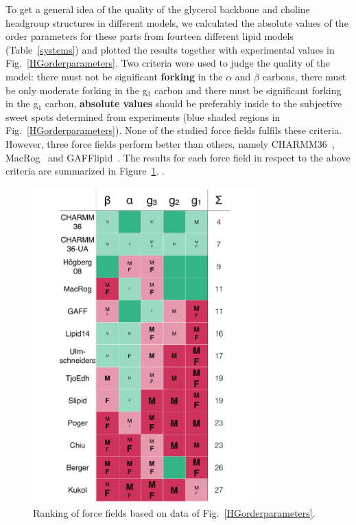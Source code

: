 \documentclass[pre,aps,floatfix,authordate1-4,twocolumn]{revtex4-1}
\begin{document}
To get a general idea of the quality of the glycerol backbone and choline headgroup structures in different models, we calculated the absolute
values of the order parameters for these parts from fourteen different lipid models (Table~\ref{systems}) and 
plotted the results together with experimental values in Fig.~\ref{HGorderparameters}.
Two criteria were used to judge the quality of the model: there must not be significant  {\bf forking} in the $\alpha$ and $\beta$ carbons,
there must be only moderate forking in the g$_3$ carbon and there must be significant forking in the g$_1$ carbon, {\bf absolute values}
should be preferably inside to the subjective sweet spots determined from experiments (blue shaded regions in Fig.~\ref{HGorderparameters}).
None of the studied force fields fulfils these criteria. However, three force fields perform better than others, namely CHARMM36~\cite{klauda10}, MacRog~\cite{maciejewski14} and GAFFlipid~\cite{dickson12}.
The results for each force field in respect to the above criteria are summarized in Figure~\ref{FullHydrationComparisonTable}.
.
\begin{figure}[]
  \centering
  \includegraphics[width=8.6cm]{../DATAreportediINblog/comparisonTable.pdf}
  \caption{\label{FullHydrationComparisonTable}
  Ranking of force fields based on data of Fig.~\ref{HGorderparameters}.
  } 
\end{figure}
\end{document}
